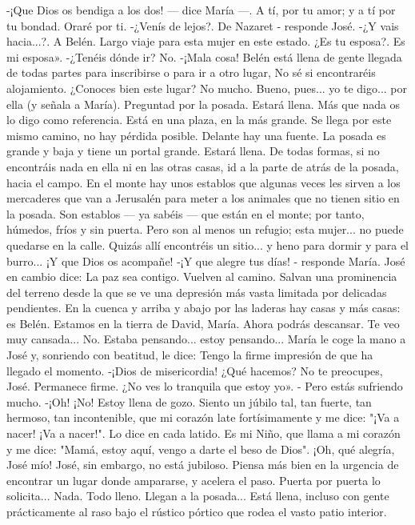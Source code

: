 \documentclass[12pt]{book} %
\begin{document}
-¡Que Dios os bendiga a los dos! — dice María —. A tí, por tu amor; y a tí por tu bondad. Oraré por ti. -¿Venís de lejos?. 
De Nazaret - responde José. 
-¿Y vais hacia...?. 
A Belén. 
Largo viaje para esta mujer en este estado. ¿Es tu esposa?. 
Es mi esposa». 
-¿Tenéis dónde ir? 
No. 
-¡Mala cosa! Belén está llena de gente llegada de todas partes para inscribirse o para ir a otro lugar, No sé si 
encontraréis alojamiento. ¿Conoces bien este lugar? 
No mucho. 
Bueno, pues... yo te digo... por ella (y señala a María). Preguntad por la posada. Estará llena. Más que nada os lo digo 
como referencia. Está en una plaza, en la más grande. Se llega por este mismo camino, no hay pérdida posible. Delante hay una fuente. La posada es grande y baja y tiene un portal grande. Estará llena. De todas formas, si no encontráis nada en ella ni en las otras casas, id a la parte de atrás de la posada, hacia el campo. En el monte hay unos establos que algunas veces les sirven a los mercaderes que van a Jerusalén  para meter a los animales que no tienen sitio en la posada. Son establos — ya sabéis — que están en el monte; por tanto, húmedos, fríos y sin puerta. Pero son al menos un refugio; esta mujer... no puede quedarse en la calle. Quizás allí encontréis un sitio... y heno para dormir y para el burro... ¡Y que Dios os acompañe! -¡Y que alegre tus días! - responde María. José en cambio dice: 
La paz sea contigo. 
Vuelven al camino. Salvan una prominencia del terreno desde la que se ve una depresión más vasta limitada por 
delicadas pendientes. En la cuenca y arriba y abajo por las laderas hay casas y más casas: es Belén. 
Estamos en la tierra de David, María. Ahora podrás descansar. Te veo muy cansada... 
No. Estaba pensando... estoy pensando... 
María le coge la mano a José y, sonriendo con beatitud, le dice: 
Tengo la firme impresión de que ha llegado el momento. 
-¡Dios de misericordia! ¿Qué hacemos? 
No te preocupes, José. Permanece firme. ¿No ves lo tranquila que estoy yo». - Pero estás sufriendo mucho. 
-¡Oh! ¡No! Estoy llena de gozo. Siento un júbilo tal, tan fuerte, tan hermoso, tan incontenible, que mi corazón late fortísimamente y me dice: "¡Va a nacer! ¡Va a nacer!". Lo dice en cada latido. Es mi Niño, que llama a mi corazón y me dice: "Mamá, estoy aquí, vengo a darte el beso de Dios". ¡Oh, qué alegría, José mío! 
José, sin embargo, no está jubiloso. Piensa más bien en la urgencia de encontrar un lugar donde ampararse, y acelera el 
paso. Puerta por puerta lo solicita... Nada. Todo lleno. Llegan a la posada... Está llena, incluso con gente prácticamente al raso bajo el rústico pórtico que rodea el vasto patio interior. 
\end{document}
